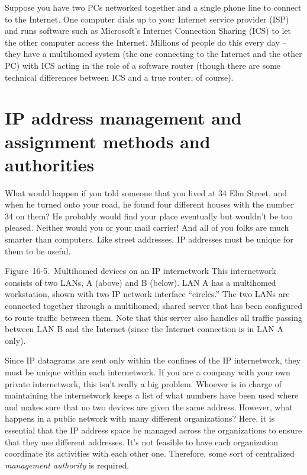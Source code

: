 Suppose you have two PCs networked together and a single phone line to
connect to the Internet. One computer dials up to your Internet service
provider (ISP) and runs software such as Microsoft's
\protect\hypertarget{ch16s05.htmlux5cux23idx-CHP-16-0672}{}{}Internet
Connection Sharing
(\protect\hypertarget{ch16s05.htmlux5cux23idx-CHP-16-0673}{}{}ICS) to
let the other computer access the Internet. Millions of people do this
every day -- they have a multihomed system (the one connecting to the
Internet and the other PC) with ICS acting in the role of a software
router (though there are some technical differences between ICS and a
true router, of course).


\section{IP address management and assignment methods and authorities}
What would happen if you told someone that you lived at 34 Elm Street, and when he
turned onto your road, he found four different houses with the number 34
on them? He probably would find your place eventually but wouldn't be
too pleased. Neither would you or your mail carrier! And all of you
folks are much smarter than computers. Like street addresses, IP
addresses must be unique for them to be useful.

\protect\hypertarget{ch16s06.htmlux5cux23multihomed_devices_on_an_ip_internetwork}{}{}

\protect\hypertarget{ch16s06.htmlux5cux23I_mediaobject2_d1e16338}{}{}

Figure~16-5.~Multihomed devices on an IP internetwork This internetwork
consists of two LANs, A (above) and B (below). LAN A has a multihomed
workstation, shown with two IP network interface ``circles.'' The two LANs
are connected together through a multihomed, shared server that has been
configured to route traffic between them. Note that this server also
handles all traffic passing between LAN B and the Internet (since the
Internet connection is in LAN A only).

Since IP datagrams are sent only within the confines of the IP
internetwork, they must be unique within each internetwork. If you are a
company with your own private internetwork, this isn't really a big
problem. Whoever is in charge of maintaining the internetwork keeps a
list of what numbers have been used where and makes sure that no two
\protect\hypertarget{ch16s06.htmlux5cux23idx-CHP-16-0675}{}{}devices are
given the same address. However, what happens in a public network with
many different organizations? Here, it is essential that the IP address
space be managed across the organizations to ensure that they use
different addresses. It's not feasible to have each organization
coordinate its activities with each other one. Therefore, some sort of
centralized {\emph{management authority}} is required.

